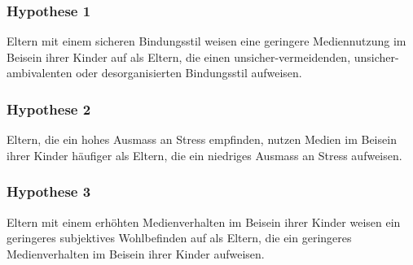 \subsubsection{Hypothese 1}
Eltern mit einem sicheren Bindungsstil weisen eine geringere Mediennutzung im Beisein ihrer Kinder auf als Eltern, die einen unsicher-vermeidenden, unsicher-ambivalenten oder desorganisierten Bindungsstil aufweisen.
\subsubsection{Hypothese 2}
Eltern, die ein hohes Ausmass an Stress empfinden, nutzen Medien im Beisein ihrer Kinder häufiger als Eltern, die ein niedriges Ausmass an Stress aufweisen.
\subsubsection{Hypothese 3}
Eltern mit einem erhöhten Medienverhalten im Beisein ihrer Kinder weisen ein geringeres subjektives Wohlbefinden auf als Eltern, die ein geringeres Medienverhalten im Beisein ihrer Kinder aufweisen.

